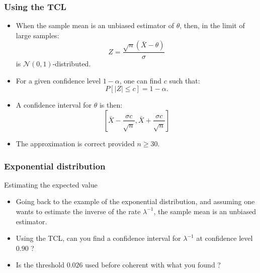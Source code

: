 \documentclass[main.tex]{subfiles}
\begin{document}
\begin{frame}
    \frametitle{Using the TCL}
\begin{itemize}
    \item<+-> When the sample mean is an unbiased estimator of $\theta$, then, in the limit of large samples:
    \begin{equation}
        Z = \frac{\sqrt{n}\left( \bar{X} - \theta \right)}{\sigma}
    \end{equation}
    is $\mathcal{N}(0,1)$-distributed.
    \item<+-> For a given confidence level $1-\alpha$, one can find $c$ such that:
    \begin{equation}
        P\left[ \lvert Z \rvert \leq c \right] = 1-\alpha.
    \end{equation}
    \item<+-> A confidence interval for $\theta$ is then:
    \begin{equation}
        \left[ \bar{X} - \frac{\sigma c}{\sqrt{n}}, \bar{X} + \frac{\sigma c}{\sqrt{n}}\right]
    \end{equation}
    \item<+-> The approximation is correct provided $n \geq 30.$
\end{itemize}
\end{frame}
\begin{frame}
    \frametitle{Exponential distribution}
\begin{block}{Estimating the expected value}
    \begin{itemize}
        \item<+-> Going back to the example of the exponential distribution, and assuming one wants to 
        estimate the inverse of the rate $\lambda^{-1}$, the sample mean is an unbiased estimator.
        \item<+-> Using the TCL, can you find a confidence interval for $\lambda^{-1}$ at confidence level $0.90$ ?
        \item<+-> Is the threshold $0.026$ used before coherent with what you found ?
    \end{itemize}
\end{block}
\end{frame}
\end{document}
